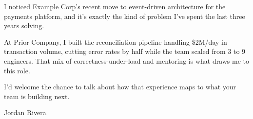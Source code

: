 \documentclass{cover}
\begin{document}
\maketitle

I noticed Example Corp's recent move to event-driven architecture for the
payments platform, and it's exactly the kind of problem I've spent the last
three years solving.

At Prior Company, I built the reconciliation pipeline handling \$2M/day in
transaction volume, cutting error rates by half while the team scaled from
3 to 9 engineers. That mix of correctness-under-load and mentoring is what
draws me to this role.

I'd welcome the chance to talk about how that experience maps to what your
team is building next.

\closing{Jordan Rivera}
\end{document}
